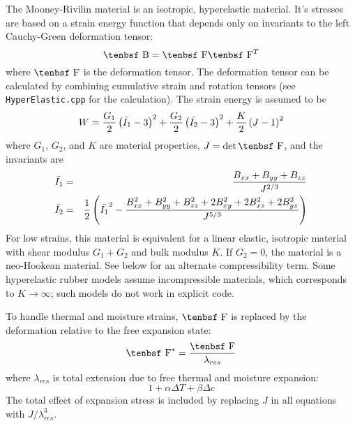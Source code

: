 \documentclass[11pt]{article}
\def\B{\hbox{\tenbsf B}}
\def\F{\hbox{\tenbsf F}}
\begin{document}
The Mooney-Rivilin material is an isotropic, hyperelastic material. It's stresses are based on a strain energy function that depends only on invariants to the left Cauchy-Green deformation tensor:
\begin{equation}
    \B = \F\F^T
\end{equation}
where $\F$ is the deformation tensor. The deformation tensor can be calculated by combining cumulative strain and rotation tensors (see {\tt HyperElastic.cpp} for the calculation). The strain energy is assumed to be
\begin{equation}
W = {G_1\over2}\left(\bar{I_1}-3\right)^2 + {G_2\over2}\left(\bar{I_2}-3\right)^2 + {K\over2}\left(J-1\right)^2
\end{equation}
where $G_1$, $G_2$, and $K$ are material properties, $J=\det\F$, and the invariants are
\begin{eqnarray}
   \bar{I_1} & = & {B_{xx}+B_{yy}+B_{zz}\over J^{2/3}} \\
   \bar{I_2} & = & {1\over2}\left(\bar{I_1}^2 - {B_{xx}^2+B_{yy}^2+B_{zz}^2+2B_{xy}^2+2B_{xz}^2+2B_{yz}^2\over J^{5/3}}\right)
\end{eqnarray}
For low strains, this material is equivalent for a linear elastic, isotropic material with shear modulus $G_1+G_2$ and bulk modulus $K$. If $G_2=0$, the material is a neo-Hookean material. See below for an alternate compressibility term. Some hyperelastic rubber models assume incompressible materials, which corresponds to $K\to\infty$; such models do not work in explicit code.

To handle thermal and moisture strains, $\F$ is replaced by the deformation relative to the free expansion state:
\begin{equation}
     \F^* = {\F\over \lambda_{res}}
\end{equation}
where $\lambda_{res}$ is total extension due to free thermal and moisture expansion:
\begin{equation}
    1 + \alpha\Delta T + \beta \Delta c
\end{equation}
The total effect of expansion stress is included by replacing $J$ in all equations with $J/\lambda_{res}^3$.
\end{document}

